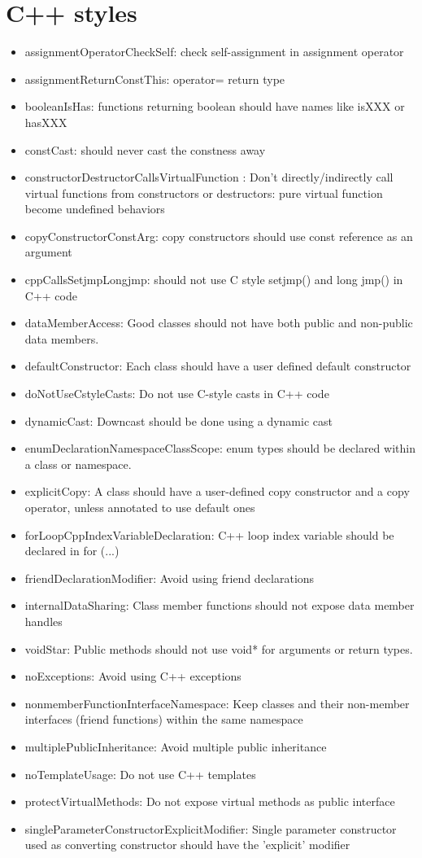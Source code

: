 \section{C++ styles}
\begin{itemize}
\item assignmentOperatorCheckSelf: check self-assignment in assignment operator
\item assignmentReturnConstThis:  operator= return type
\item booleanIsHas: functions returning boolean should have names like isXXX or hasXXX
\item constCast: should never cast the constness away
\item constructorDestructorCallsVirtualFunction : Don't directly/indirectly call virtual functions from constructors or destructors: pure virtual function become undefined behaviors
\item copyConstructorConstArg: copy constructors should use const reference as an argument
\item cppCallsSetjmpLongjmp: should not use C style setjmp() and long jmp() in C++ code
\item dataMemberAccess: Good classes should not have both public and non-public data members. 
\item defaultConstructor: Each class should have a user defined default constructor
\item doNotUseCstyleCasts: Do not use C-style casts in C++ code
\item dynamicCast: Downcast should be done using a dynamic cast
\item enumDeclarationNamespaceClassScope: enum types should be declared within a class or namespace. 
\item explicitCopy: A class should have a user-defined copy constructor and a copy operator, unless annotated to use default ones
\item forLoopCppIndexVariableDeclaration: C++ loop index variable should be declared in for (...)
\item friendDeclarationModifier: Avoid using friend declarations
\item internalDataSharing: Class member functions should not expose data member handles
\item voidStar: Public methods should not use void* for arguments or return types. 
\item noExceptions: Avoid using C++ exceptions
\item nonmemberFunctionInterfaceNamespace: Keep classes and their non-member interfaces (friend functions) within the same namespace
\item multiplePublicInheritance: Avoid multiple public inheritance
\item noTemplateUsage: Do not use C++ templates
\item protectVirtualMethods: Do not expose virtual methods as public interface
\item singleParameterConstructorExplicitModifier: Single parameter constructor used as converting constructor should have the 'explicit' modifier
\end{itemize}

